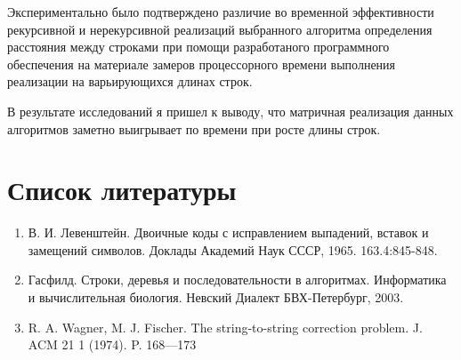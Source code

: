 \documentclass[12pt]{report}
\begin{document}
Экспериментально было подтверждено различие во временной эффективности рекурсивной и нерекурсивной реализаций выбранного алгоритма определения расстояния между строками при помощи разработаного программного обеспечения на материале замеров процессорного времени выполнения реализации на варьирующихся длинах строк. 

В результате исследований я пришел к выводу, что матричная реализация данных алгоритмов заметно выигрывает по времени при росте длины строк.


\chapter*{Список литературы}
\begin{enumerate}
    \item  В. И. Левенштейн. Двоичные коды с исправлением выпадений, вставок и замещений символов. Доклады Академий Наук СССР, 1965. 163.4:845-848.
    \item Гасфилд. Строки, деревья и последовательности в алгоритмах. Информатика и вычислительная биология. Невский Диалект БВХ-Петербург, 2003.
    \item R. A. Wagner, M. J. Fischer. The string-to-string correction problem. J. ACM 21 1 (1974). P. 168—173
\end{enumerate}
\end{document}
